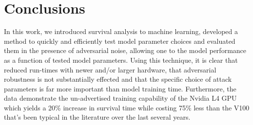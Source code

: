 \documentclass[conference]{IEEEtran}
\begin{document}
\section{Conclusions}
\label{conclusion}

In this work, we introduced survival analysis to machine learning, developed a method to quickly and efficiently test model parameter choices and evaluated them in the presence of adversarial noise, allowing one to the model performance as a function of tested model parameters.
Using this technique, it is clear that reduced run-times with newer and/or larger hardware, that adversarial robustness is not substantially effected and that the specific choice of attack parameters is far more important than model training time.
Furthermore, the data demonstrate the un-advertised training capability of the Nvidia L4 GPU which yields a 20\% increase in survival time while costing 75\% less than the V100 that's been typical in the literature over the last several years.

%
\IEEEpeerreviewmaketitle
\clearpage
\printglossary[type=\acronymtype]
\clearpage


\end{document}
